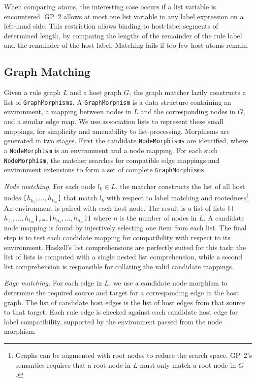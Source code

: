 When comparing atoms, the interesting case occurs if a list variable is encountered. GP~2 allows at most one list variable in any label expression on a left-hand side. This restriction allows binding to host-label segments of determined length, by comparing the lengths of the remainder of the rule label and the remainder of the host label. Matching fails if too few host atoms remain.

\subsection{Graph Matching}\label{sec:graph-match}

Given a rule graph $L$ and a host graph $G$, the graph matcher lazily constructs a list of \texttt{GraphMorphisms}. A \texttt{GraphMorphism} is a data structure containing an environment, a mapping between nodes in $L$ and the corresponding nodes in $G$, and a similar edge map. We use association lists to represent these small mappings, for simplicity and amenability to list-processing.  Morphisms are generated in two stages. First the candidate \texttt{NodeMorphisms} are identified, where a \texttt{NodeMorphism} is an environment and a node mapping. For each such \texttt{NodeMorphism}, the matcher searches for compatible edge mappings and environment extensions to form a set of complete \texttt{GraphMorphisms}.

\vspace{.5\baselineskip}
\noindent
\emph{Node matching.}
For each node $l_k \in L$, the matcher constructs the list of all host nodes \texttt{[$h_{k_1}, \ldots, h_{k_m}$]} that match $l_k$ with respect to label matching and rootedness\footnote{Graphs can be augmented with root nodes to reduce the search space. GP~2's semantics requires that a root node in $L$ must only match a root node in $G$ \cite{Bak-Plump12a}.} An environment is paired with each host node. The result is a list of lists \texttt{[[$h_{1_1}, \ldots, h_{1_m}$],\ldots,[$h_{n_1}, \ldots, h_{n_m}$]]} where $n$ is the number of nodes in $L$. A candidate node mapping is found by injectively selecting one item from each list. The final step is to test each candidate mapping for compatibility with respect to its environment. Haskell's list comprehensions are perfectly suited for this task: the list of lists is computed with a single nested list comprehension, while a second list comprehension is responsible for collating the valid candidate mappings. 

\vspace{.5\baselineskip}
\noindent
\emph{Edge matching.} 
For each edge in $L$, we use a candidate node morphism to determine the required source and target for a corresponding edge in the host graph. The list of candidate host edges is the list of host edges from that source to that target. Each rule edge is checked against each candidate host edge for label compatibility, supported by the environment passed from the node morphism.

